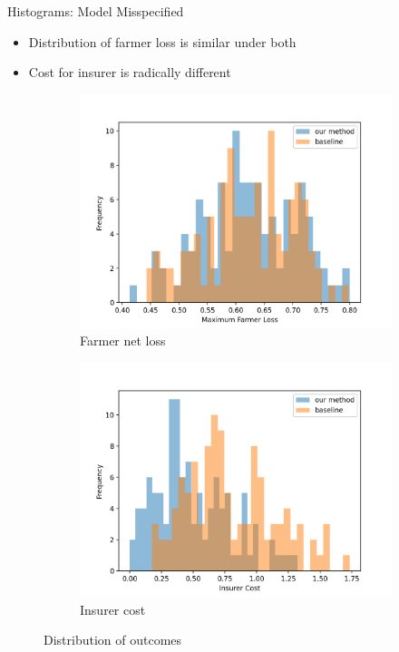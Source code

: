 \documentclass{beamer}
\begin{document}
    \begin{frame}{Histograms: Model Misspecified}
        \begin{itemize}
            \item Distribution of farmer loss is similar under both
            \item Cost for insurer is radically different
        \end{itemize}
        \begin{figure}
        \centering
          \begin{subfigure}[b]{0.47\textwidth}
            \includegraphics[width=\textwidth]{../../../output/figures/Logit_Bootstrap/farmer_loss_hist_no_corr_nonlinear.png}
            \caption{Farmer net loss}
            \label{fig:f1}
          \end{subfigure}
         \hfill
          \begin{subfigure}[b]{0.47\textwidth}
            \includegraphics[width=\textwidth]{../../../output/figures/Logit_Bootstrap/insurer_cost_no_corr_nonlinear.png}
            \caption{Insurer cost}
            \label{fig:f2}
          \end{subfigure}
          \caption{Distribution of outcomes}
        \end{figure}
            
        \end{frame}
\end{document}
